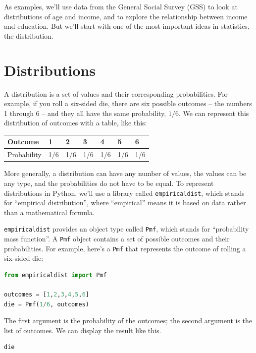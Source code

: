 \documentclass[
]{book}
\newcommand{\passthrough}[1]{#1}
\begin{document}
As examples, we'll use data from the General Social Survey (GSS) to look
at distributions of age and income, and to explore the relationship
between income and education. But we'll start with one of the most
important ideas in statistics, the distribution.

\section{Distributions}\label{distributions-1}

A distribution is a set of values and their corresponding probabilities.
For example, if you roll a six-sided die, there are six possible
outcomes -- the numbers 1 through 6 -- and they all have the same
probability, \(1/6\). We can represent this distribution of outcomes
with a table, like this:

\begin{longtable}[]{@{}lllllll@{}}
\toprule\noalign{}
Outcome & 1 & 2 & 3 & 4 & 5 & 6 \\
\midrule\noalign{}
\endhead
\bottomrule\noalign{}
\endlastfoot
Probability & 1/6 & 1/6 & 1/6 & 1/6 & 1/6 & 1/6 \\
\end{longtable}

More generally, a distribution can have any number of values, the values
can be any type, and the probabilities do not have to be equal. To
represent distributions in Python, we'll use a library called
\passthrough{\lstinline!empiricaldist!}, which stands for ``empirical
distribution'', where ``empirical'' means it is based on data rather
than a mathematical formula.

\passthrough{\lstinline!empiricaldist!} provides an object type called
\passthrough{\lstinline!Pmf!}, which stands for ``probability mass
function''. A \passthrough{\lstinline!Pmf!} object contains a set of
possible outcomes and their probabilities. For example, here's a
\passthrough{\lstinline!Pmf!} that represents the outcome of rolling a
six-sided die:

\begin{lstlisting}[language=Python]
from empiricaldist import Pmf

outcomes = [1,2,3,4,5,6]
die = Pmf(1/6, outcomes)
\end{lstlisting}

The first argument is the probability of the outcomes; the second
argument is the list of outcomes. We can display the result like this.

\begin{lstlisting}[language=Python]
die
\end{lstlisting}
\end{document}
